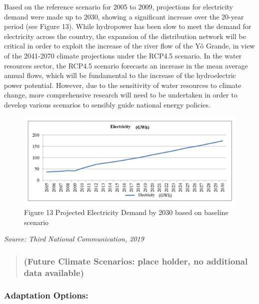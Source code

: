 \documentclass[
]{book}
\begin{document}
Based on the reference scenario for 2005 to 2009, projections for electricity demand were made up to 2030, showing a significant increase over the 20-year period (see Figure 13). While hydropower has been slow to meet the demand for electricity across the country, the expansion of the distribution network will be critical in order to exploit the increase of the river flow of the Yô Grande, in view of the 2041-2070 climate projections under the RCP4.5 scenario. In the water resources sector, the RCP4.5 scenario forecasts an increase in the mean average annual flows, which will be fundamental to the increase of the hydroelectric power potential. However, due to the sensitivity of water resources to climate change, more comprehensive research will need to be undertaken in order to develop various scenarios to sensibly guide national energy policies.

\begin{figure}
\centering
\includegraphics{images/electricity_demands.png}
\caption{Figure 13 Projected Electricity Demand by 2030 based on baseline scenario}
\end{figure}

\emph{Source: Third National Communication, 2019}

\begin{quote}
\hypertarget{future-climate-scenarios-place-holder-no-additional-data-available}{%
\subsubsection{(Future Climate Scenarios: place holder, no additional data available)}\label{future-climate-scenarios-place-holder-no-additional-data-available}}
\end{quote}

\hypertarget{adaptation-options-4}{%
\subsubsection{Adaptation Options:}\label{adaptation-options-4}}
\end{document}

